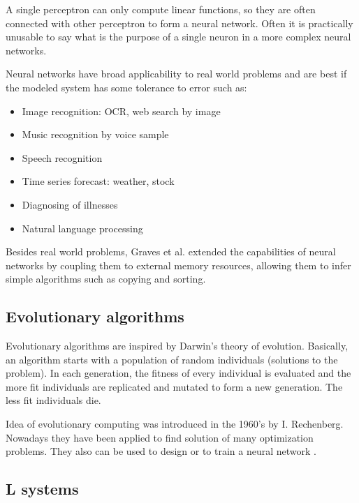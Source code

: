 A single perceptron can only compute linear functions, so they are often connected with other perceptron to form a neural network. Often it is practically unusable to say what is the purpose of a single neuron in a more complex neural networks.

Neural networks have broad applicability to real world problems and are best if the modeled system has some tolerance to error such as:
\begin{itemize}
  \item Image recognition: OCR, web search by image
  \item Music recognition by voice sample
  \item Speech recognition
  \item Time series forecast: weather, stock
  \item Diagnosing of illnesses
  \item Natural language processing
\end{itemize}

Besides real world problems, Graves et al. \cite{Graves14NeuralTM} extended the capabilities of neural networks by coupling them to external memory resources, allowing them to infer simple algorithms such as copying and sorting.


\subsection{Evolutionary algorithms} %
\label{sub:evolutionary_algorithms}

 Evolutionary algorithms are inspired by Darwin's theory of evolution. Basically, an algorithm starts with a population of random individuals (solutions to the problem). In each generation, the fitness of every individual is evaluated and the more fit individuals are replicated and mutated to form a new generation. The less fit individuals die.

Idea of evolutionary computing was introduced in the 1960's by I. Rechenberg. Nowadays they have been applied to find solution of many optimization problems. They also can be used to design or to train a neural network \cite{Montana:1989:TrainNeuronByGenetic}.


\subsection{L systems} %
\label{sub:l_systems}


